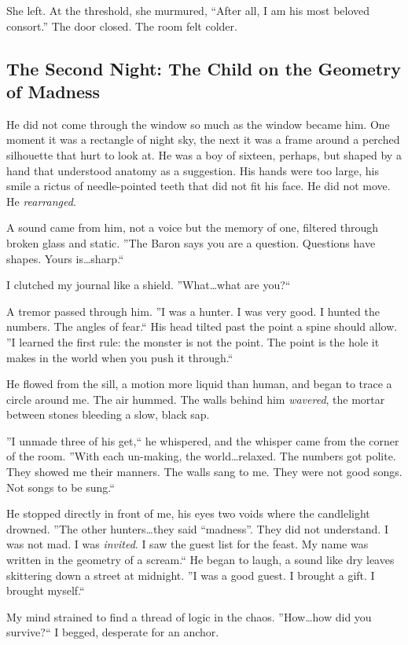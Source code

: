 \documentclass[11pt]{article}
\begin{document}
She left. At the threshold, she murmured, ``After all, I am his most beloved consort.'' The door closed. The room felt colder.

\subsection*{The Second Night: The Child on the Geometry of Madness}

He did not come through the window so much as the window became him. One moment it was a rectangle of night sky, the next it was a frame around a perched silhouette that hurt to look at. He was a boy of sixteen, perhaps, but shaped by a hand that understood anatomy as a suggestion. His hands were too large, his smile a rictus of needle-pointed teeth that did not fit his face. He did not move. He \textit{rearranged}.

A sound came from him, not a voice but the memory of one, filtered through broken glass and static. ''The Baron says you are a question. Questions have shapes. Yours is\dots sharp.``

I clutched my journal like a shield. ''What\dots what are you?``

A tremor passed through him. ''I was a hunter. I was very good. I hunted the numbers. The angles of fear.`` His head tilted past the point a spine should allow. ''I learned the first rule: the monster is not the point. The point is the hole it makes in the world when you push it through.``

He flowed from the sill, a motion more liquid than human, and began to trace a circle around me. The air hummed. The walls behind him \textit{wavered}, the mortar between stones bleeding a slow, black sap.

''I unmade three of his get,`` he whispered, and the whisper came from the corner of the room. ''With each un-making, the world\dots relaxed. The numbers got polite. They showed me their manners. The walls sang to me. They were not good songs. Not songs to be sung.``

He stopped directly in front of me, his eyes two voids where the candlelight drowned. ''The other hunters\dots they said ``madness''. They did not understand. I was not mad. I was \textit{invited}. I saw the guest list for the feast. My name was written in the geometry of a scream.`` He began to laugh, a sound like dry leaves skittering down a street at midnight. ''I was a good guest. I brought a gift. I brought myself.``

My mind strained to find a thread of logic in the chaos. ''How\dots how did you survive?`` I begged, desperate for an anchor.
\end{document}
